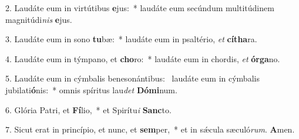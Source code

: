 2. Laudáte eum in virtútibus \textbf{e}jus:~*  laudáte eum secúndum multitúdinem magnitúdi\textit{nis} \textbf{e}jus.\

3. Laudáte eum in sono \textbf{tu}bæ:~*  laudáte eum in psaltério, \textit{et} \textbf{cí}\textbf{tha}ra.\

4. Laudáte eum in týmpano, et \textbf{cho}ro:~*  laudáte eum in chordis, \textit{et} \textbf{ór}\textbf{ga}no.\

5. Laudáte eum in cýmbalis benesonántibus: \dag\  laudáte eum in cýmbalis jubilati\textbf{ó}nis:~*  omnis spíritus lau\textit{det} \textbf{Dó}\textbf{mi}num.\

6. Glória Patri, et \textbf{Fí}lio,~*  et Spirítu\textit{i} \textbf{Sanc}to.\

7. Sicut erat in princípio, et nunc, et \textbf{sem}per,~*  et in sǽcula sæculó\textit{rum}. \textbf{A}men.\

